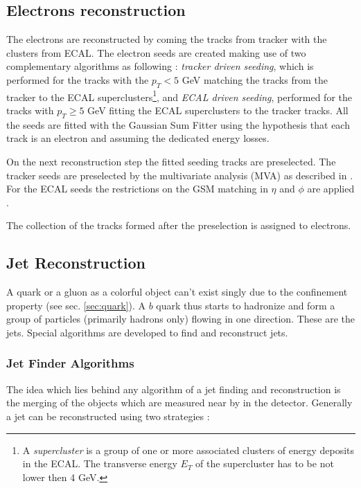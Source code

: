 \subsection{Electrons reconstruction}\label{ssec:ElRec}

The electrons are reconstructed by coming the tracks from tracker with the clusters from ECAL. The electron seeds
are created making use of two complementary algorithms as following \cite{CMS-PAS-EGM-10-004}: \textit{tracker driven seeding}, 
which is performed for the tracks with the $p_{T} < 5$ GeV matching the tracks from the tracker to the ECAL superclusters\footnote
{A \textit{supercluster} is a group of one or more associated clusters of energy deposits in the ECAL. The transverse energy $E_{T}$
of the supercluster has to be not lower then 4 GeV.}, and \textit{ECAL driven seeding}, performed for the tracks with $p_{T} \geq 5$ GeV
fitting the ECAL superclusters to the tracker tracks. All the seeds are fitted with the Gaussian Sum Fitter \cite{GSF_Electron_Reconstruction_CMS}
using the hypothesis that each track is an electron and assuming the dedicated energy losses.

On the next reconstruction step the fitted seeding tracks are preselected. The tracker seeds are preselected by the multivariate analysis 
(MVA) as described in \cite{CMS:2010byl}. For the ECAL seeds the restrictions on the GSM matching in $\eta$ and $\phi$ are applied \cite{Baffioni:2006cd}.

The collection of the tracks formed after the preselection is assigned to electrons.

\subsection{Jet Reconstruction}

A quark or a gluon as a colorful object can't exist singly due to the confinement property (see sec. \ref{sec:quark}).
A $b$ quark thus starts to hadronize and form a group of particles (primarily hadrons only) flowing in one direction. These are the jets. Special algorithms are developed
to find and reconstruct jets.

\subsubsection{Jet Finder Algorithms}

The idea which lies behind any algorithm of a jet finding and reconstruction is the merging of the objects which are measured near by in the detector.
Generally a jet can be reconstructed using two strategies \cite{Salam:2007xv}:

